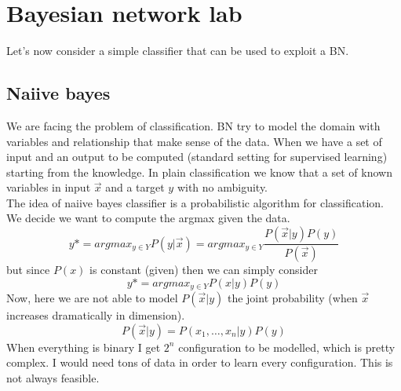 \chapter{Bayesian network lab}
\label{cha:bay_net_lab}

Let's now consider a simple classifier that can be used to exploit a BN.\\

\section{Naiive bayes}
We are facing the problem of classification. BN try to model the domain with variables and relationship that make sense of the data. 
When we have a set of input and an output to be computed (standard setting for supervised learning) starting from the knowledge. 
In plain classification we know that a set of known variables in input $\Vec{x}$ and a target $y$ with no ambiguity.\\
The idea of naiive bayes classifier is a probabilistic algorithm for classification. We decide we want to compute the argmax given the data. 
$$y* = argmax_{y \in Y} P(y|\Vec{x}) = argmax _{y \in Y} \frac{P(\Vec{x}|y)P(y)}{P(\Vec{x})}$$
but since $P(x)$ is constant (given) then we can simply consider 
$$y* = argmax_{y \in Y} {P(x|y)P(y)}$$
Now, here we are not able to model $P(\Vec{x}|y)$ the joint probability (when $\Vec{x}$ increases dramatically in dimension). 
$$P(\Vec{x}|y) = P(x_1, \dots, x_n| y) P(y)$$
When everything is binary I get $2^n$ configuration to be modelled, which is pretty complex. I would need tons of data in order to learn every configuration. This is not always feasible.\\

